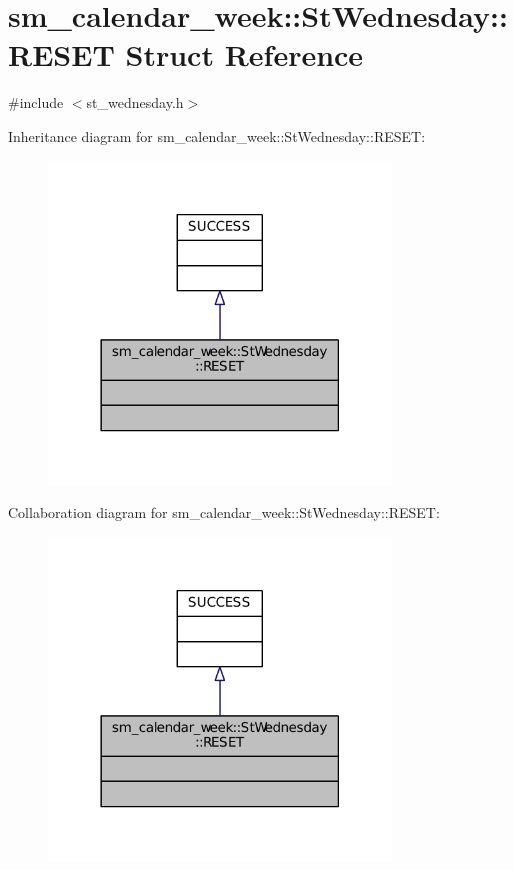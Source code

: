 \hypertarget{structsm__calendar__week_1_1StWednesday_1_1RESET}{}\section{sm\+\_\+calendar\+\_\+week\+:\+:St\+Wednesday\+:\+:R\+E\+S\+ET Struct Reference}
\label{structsm__calendar__week_1_1StWednesday_1_1RESET}


{\ttfamily \#include $<$st\+\_\+wednesday.\+h$>$}



Inheritance diagram for sm\+\_\+calendar\+\_\+week\+:\+:St\+Wednesday\+:\+:R\+E\+S\+ET\+:
\nopagebreak
\begin{figure}[H]
\begin{center}
\leavevmode
\includegraphics[width=258pt]{structsm__calendar__week_1_1StWednesday_1_1RESET__inherit__graph}
\end{center}
\end{figure}


Collaboration diagram for sm\+\_\+calendar\+\_\+week\+:\+:St\+Wednesday\+:\+:R\+E\+S\+ET\+:
\nopagebreak
\begin{figure}[H]
\begin{center}
\leavevmode
\includegraphics[width=258pt]{structsm__calendar__week_1_1StWednesday_1_1RESET__coll__graph}
\end{center}
\end{figure}


